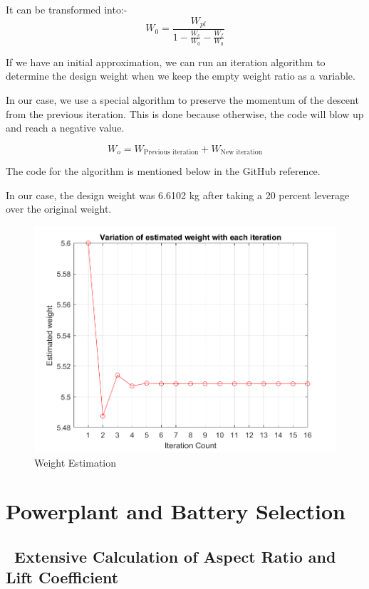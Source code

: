 \documentclass[12 pt]{article}
\begin{document}
It can be transformed into:- 
$$W_{0} = \frac{W_{pl}}{1 - \frac{W_{e}}{W_{0}} - \frac{W_{f}}{W_0}}$$

If we have an initial approximation, we can run an iteration algorithm to determine the design weight when we keep the empty weight ratio as a variable.


In our case, we use a special algorithm to preserve the momentum of the descent from the previous iteration. This is done because otherwise, the code will blow up and reach a negative value. 

$$ W_o = W_{\text{Previous iteration}} + W_{\text{New iteration}} $$

The code for the algorithm is mentioned below in the GitHub reference.

In our case, the design weight was 6.6102 kg after taking a 20 percent leverage over the original weight.

\begin{figure}
    \centering
    \includegraphics[width=0.75\linewidth]{Codes/Week 2/weight.png}
    \caption{Weight Estimation}
    \label{Weight Estimation}
\end{figure}

\vfill

\newpage

\section{Powerplant and Battery Selection}

\subsection{\ Extensive Calculation of Aspect Ratio and Lift Coefficient}
\end{document}
